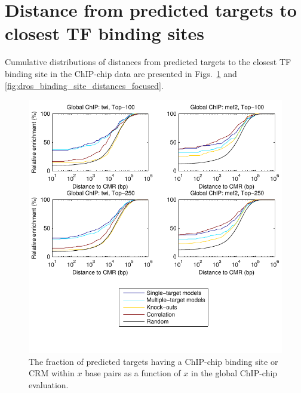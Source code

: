 \documentclass{article}
\begin{document}
\section{Distance from predicted targets to closest TF binding sites}

Cumulative distributions of distances from predicted targets to the
closest TF binding site in the ChIP-chip data are presented in
Figs.~\ref{fig:dros_binding_site_distances_global} and
\ref{fig:dros_binding_site_distances_focused}.

\begin{figure}[p]
  \centering
  \includegraphics{dros_binding_site_distances_global}
  \caption{The fraction of predicted targets having a ChIP-chip
    binding site or CRM within $x$ base pairs as a function of $x$
    in the global ChIP-chip evaluation.
    \label{fig:dros_binding_site_distances_global}}
\end{figure}
\end{document}
